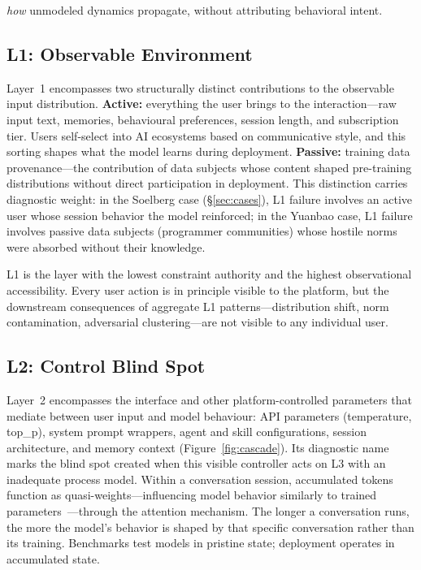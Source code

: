 \textit{how} unmodeled dynamics propagate, without attributing behavioral intent.

\subsection{L1: Observable Environment}

Layer~1 encompasses two structurally distinct contributions to the observable input distribution. \textbf{Active:} everything the user brings to the interaction---raw input text, memories, behavioural preferences, session length, and subscription tier. Users self-select into AI ecosystems based on communicative style, and this sorting shapes what the model learns during deployment. \textbf{Passive:} training data provenance---the contribution of data subjects whose content shaped pre-training distributions without direct participation in deployment. This distinction carries diagnostic weight: in the Soelberg case (\S\ref{sec:cases}), L1 failure involves an active user whose session behavior the model reinforced; in the Yuanbao case, L1 failure involves passive data subjects (programmer communities) whose hostile norms were absorbed without their knowledge.

L1 is the layer with the lowest constraint authority and the highest observational accessibility. Every user action is in principle visible to the platform, but the downstream consequences of aggregate L1 patterns---distribution shift, norm contamination, adversarial clustering---are not visible to any individual user.

\subsection{L2: Control Blind Spot}

Layer~2 encompasses the interface and other platform-controlled parameters that mediate between user input and model behaviour: API parameters (temperature, top\_p), system prompt wrappers, agent and skill configurations, session architecture, and memory context (Figure~\ref{fig:cascade}). Its diagnostic name marks the blind spot created when this visible controller acts on L3 with an inadequate process model. Within a conversation session, accumulated tokens function as quasi-weights---influencing model behavior similarly to trained parameters~\cite{dai2023can, olsson2022context}---through the attention mechanism. The longer a conversation runs, the more the model's behavior is shaped by that specific conversation rather than its training. Benchmarks test models in pristine state; deployment operates in accumulated state.

